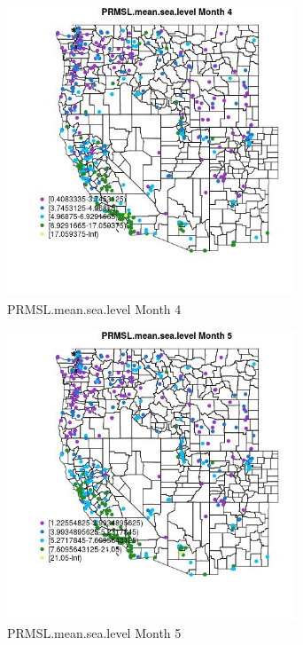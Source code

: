 \begin{figure} 
\centering  
\includegraphics[width=0.77\textwidth]{Code_Outputs/ML_input_report_ML_input_PM25_Step5_part_d_de_duplicated_aves_ML_input_MapObsMo4PRMSLmeansealevel.jpg} 
\caption{\label{fig:ML_input_report_ML_input_PM25_Step5_part_d_de_duplicated_aves_ML_inputMapObsMo4PRMSLmeansealevel}PRMSL.mean.sea.level Month 4} 
\end{figure} 
 

\begin{figure} 
\centering  
\includegraphics[width=0.77\textwidth]{Code_Outputs/ML_input_report_ML_input_PM25_Step5_part_d_de_duplicated_aves_ML_input_MapObsMo5PRMSLmeansealevel.jpg} 
\caption{\label{fig:ML_input_report_ML_input_PM25_Step5_part_d_de_duplicated_aves_ML_inputMapObsMo5PRMSLmeansealevel}PRMSL.mean.sea.level Month 5} 
\end{figure} 
 

